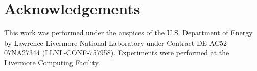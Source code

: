 \documentclass[10]{article}
\begin{document}
\section{Acknowledgements}

This work was performed under the auspices of the U.S. Department of Energy by Lawrence Livermore National Laboratory under Contract DE-AC52-07NA27344 (LLNL-CONF-757958). 
Experiments were performed at the Livermore Computing Facility.



\end{document}
